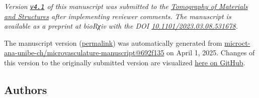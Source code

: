 \emph{Version \href{https://github.com/microct-ana-unibe-ch/microvasculature-manuscript/releases/tag/v4.0}{\texttt{v4.1}} of this manuscript was submitted to the \href{https://www.sciencedirect.com/journal/tomography-of-materials-and-structures}{Tomography of Materials and Structures} after implementing reviewer comments. The manuscript is available as a preprint at bioRχiv with the DOI \href{https://doi.org/10.1101/2023.03.08.531678}{10.1101/2023.03.08.531678}.}

The manuscript version
(\href{https://microct-ana-unibe-ch.github.io/microvasculature-manuscript/v/692f13542a10d51cb4013de26082db7ccd237b86/}{permalink})
was automatically generated
from \href{https://github.com/microct-ana-unibe-ch/microvasculature-manuscript/tree/692f13542a10d51cb4013de26082db7ccd237b86}{microct-ana-unibe-ch/microvasculature-manuscript@692f135}
on April 1, 2025.
Changes of this version to the originally submitted version are visualized \href{https://github.com/microct-ana-unibe-ch/microvasculature-manuscript/compare/v4.0...692f13542a10d51cb4013de26082db7ccd237b86\#files_bucket}{here on GitHub}.

\hypertarget{authors}{%
\subsection{Authors}\label{authors}}

